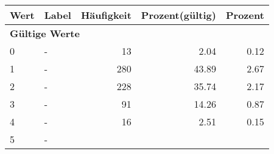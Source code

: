      \begin{longtable}{lXrrr}
     \toprule
     \textbf{Wert} & \textbf{Label} & \textbf{Häufigkeit} & \textbf{Prozent(gültig)} & \textbf{Prozent} \\
     \endhead
     \midrule
     \multicolumn{5}{l}{\textbf{Gültige Werte}}\\

     0 &
     \multicolumn{1}{X}{ -  } &


       \num{13} &
       \num[round-mode=places,round-precision=2]{2,04} &
         \num[round-mode=places,round-precision=2]{0,12} \\

     1 &
     \multicolumn{1}{X}{ -  } &


       \num{280} &
       \num[round-mode=places,round-precision=2]{43,89} &
         \num[round-mode=places,round-precision=2]{2,67} \\

     2 &
     \multicolumn{1}{X}{ -  } &


       \num{228} &
       \num[round-mode=places,round-precision=2]{35,74} &
         \num[round-mode=places,round-precision=2]{2,17} \\

     3 &
     \multicolumn{1}{X}{ -  } &


       \num{91} &
       \num[round-mode=places,round-precision=2]{14,26} &
         \num[round-mode=places,round-precision=2]{0,87} \\

     4 &
     \multicolumn{1}{X}{ -  } &


       \num{16} &
       \num[round-mode=places,round-precision=2]{2,51} &
         \num[round-mode=places,round-precision=2]{0,15} \\

     5 &
     \multicolumn{1}{X}{ -  } &



\end{longtable}
